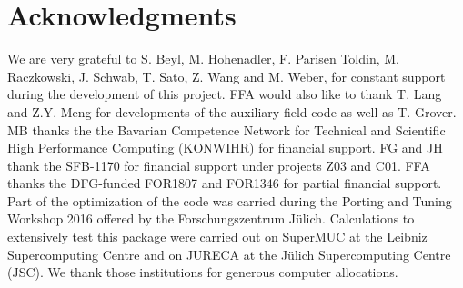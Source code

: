 \section*{Acknowledgments} 

We are very grateful to  S. Beyl, M. Hohenadler,  F. Parisen Toldin,  M. Raczkowski,  J. Schwab, T. Sato, Z. Wang and M. Weber,  for constant support during the development of this project.  FFA would also like to thank T. Lang   and Z.Y. Meng for  developments of the auxiliary field code as well as T. Grover. 
MB thanks the the Bavarian Competence Network for Technical and Scientific High Performance Computing (KONWIHR) for financial support. FG  and JH thank the SFB-1170 for  financial support under projects Z03 and C01.  FFA thanks the DFG-funded FOR1807 and FOR1346 for partial financial support.
Part of the optimization of the code was carried during  the  Porting and Tuning Workshop 2016 offered by the Forschungszentrum J\"ulich.
Calculations  to extensively test this package were carried out on SuperMUC at the  Leibniz Supercomputing Centre and on  JURECA \cite{Jureca16} at the J\"ulich Supercomputing Centre (JSC). We thank those institutions for generous computer allocations.  
